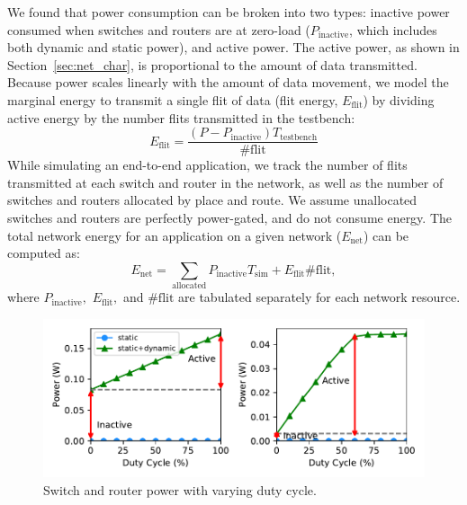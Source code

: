 We found that power consumption can be broken into two types: 
inactive power consumed when switches and routers are at zero-load ($P_{\text{inactive}}$, which includes both dynamic and static power),
and active power. The active power, as shown in Section~\ref{sec:net_char}, is proportional to the amount of
data transmitted. 
Because power scales linearly with the amount of data movement, we model the marginal energy to transmit a single flit of data (flit energy, $E_{\text{flit}}$) by dividing active energy by the number flits transmitted in the testbench:
\begin{equation}
  E_{\text{flit}} = \frac{\left(P-P_{\text{inactive}}\right) T_{\text{testbench}}}{\#\text{flit}} 
\end{equation}
While simulating an end-to-end application, we track the number of flits transmitted at each switch and router in the network, as well as the number of switches and routers allocated by place and route. 
We assume unallocated switches and routers are perfectly power-gated, and do not consume energy.
The total network energy for an application on a given network ($E_{\text{net}}$) can be computed as:
\begin{equation}
  E_{\text{net}} = \sum_{\text{allocated}} P_{\text{inactive}} T_{\text{sim}}
  + E_{\text{flit}}  \#\text{flit},
\end{equation}
where $P_{\text{inactive}},$ $E_{\text{flit}},$ and $\#\text{flit}$ are tabulated separately for each network resource.


\begin{figure}
\centering
\includegraphics[width=0.8\columnwidth]{network/figs/sweep.pdf}
  \caption{Switch and router power with varying duty cycle.}\label{fig:sweep}
\end{figure}



